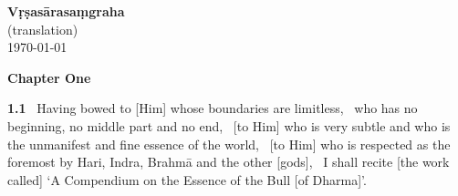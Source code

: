 \documentclass{article}
\begin{document}
\begin{center}{\Huge \textbf{Vṛṣasārasaṃgraha}}\\ {\Large (translation)}\bigskip\\ {\large\today}\end{center}
\vfill\pagebreak\begin{center}{\large\textbf{  Chapter One 
}}\end{center}


\textbf{1.1}%
\  Having bowed to [Him] whose boundaries are limitless,%
\              who has no beginning, no middle part and no end,%
\              [to Him] who is very subtle and who is the unmanifest and fine essence of the world,%
\ [to Him] who is respected as the foremost by Hari, Indra, Brahmā and the other [gods],%
\              I shall recite [the work called] `A Compendium on the Essence of the Bull [of Dharma]'.%
\end{document}
